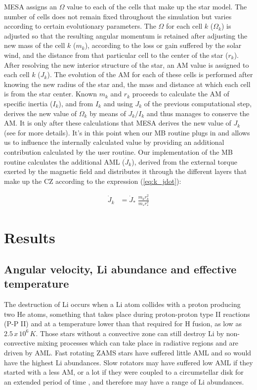 \documentclass[fleqn,usenatbib]{mnras}
\begin{document}
MESA assigns an $\Omega$ value to each of the cells that make up the star model. The number of cells does not remain fixed throughout the simulation but varies according to certain evolutionary parameters. The $\Omega$ for each cell $k$ ($\Omega_k$) is adjusted so that the resulting angular momentum is retained after adjusting the new mass of the cell $k$ ($m_k$), according to the loss or gain suffered by the solar wind, and the distance from that particular cell to the center of the star ($r_k$). After resolving the new interior structure of the star, an AM value is assigned to each cell $k$ ($J_k$). The evolution of the AM for each of these cells is performed after knowing the new radius of the star and, the mass and distance at which each cell is from the star center. Known $m_k$ and $r_k$ proceeds to calculate the AM of specific inertia ($I_k$), and from $I_k$ and using $J_k$ of the previous computational step, derives the new value of $\Omega_k$ by means of $J_k/I_k$ and thus manages to conserve the AM. It is only after these calculations that MESA derives the new value of $J_k$ (see \citet{Paxton2015} for more details). It's in this point when our MB routine plugs in and allows us to influence the internally calculated value by providing an additional contribution calculated by the user routine. Our implementation of the MB routine calculates the additional AML ($\Dot{J}_{k}$), derived from the external torque exerted by the magnetic field and distributes it through the different layers that make up the CZ according to the expression (\ref{eq:k_jdot}):\par

\begin{ceqn}
\begin{align}
\Dot{J}_{k} &= \Dot{J}_*\;\frac{m^{}_{k} r^2_{k}}{m^{}_* r_*^2} \label{eq:k_jdot}
\end{align}
\end{ceqn}

\section{Results} \label{sec_3}
\subsection{Angular velocity, Li abundance and effective temperature}
The destruction of Li occurs when a Li atom collides with a proton producing two He atoms, something that takes place during proton-proton type II reactions (P-P II) and at a temperature lower than that required for H fusion, as low as $2.5\, x\, 10^6\, K$. Those stars without a convective zone can still destroy Li by non-convective mixing processes which can take place in radiative regions and are driven by AML. Fast rotating ZAMS stars have suffered little AML and so would have the highest Li abundances. Slow rotators may have suffered low AML if they started with a less AM, or a lot if they were coupled to a circumstellar disk for an extended period of time \citep{Eggenberger2010}, and therefore may have a range of Li abundances. \par
\end{document}
